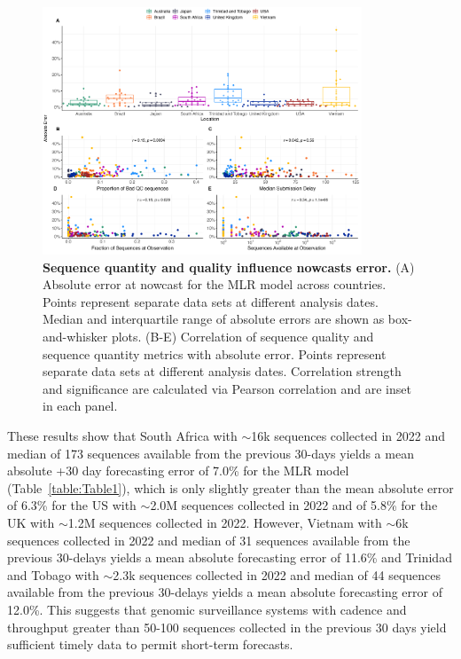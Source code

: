 \begin{figure}[tb!]
	\centering
    \includegraphics[width=0.85\textwidth]{figures/Var_of_interest.png}
	\caption{
		\textbf{Sequence quantity and quality influence nowcasts error.}
    (A) Absolute error at nowcast for the MLR model across countries.
		Points represent separate data sets at different analysis dates.
		Median and interquartile range of absolute errors are shown as box-and-whisker plots.
		(B-E) Correlation of sequence quality and sequence quantity metrics with absolute error.
		Points represent separate data sets at different analysis dates.
    Correlation strength and significance are calculated via Pearson correlation and are inset in each panel.
	}
	\label{fig:Fig5}
\end{figure}

These results show that South Africa with $\sim$16k sequences collected in 2022 and median of 173 sequences available from the previous 30-days yields a mean absolute +30 day forecasting error of 7.0\% for the MLR model (Table~\ref{table:Table1}), which is only slightly greater than the mean absolute error of 6.3\% for the US with $\sim$2.0M sequences collected in 2022 and of 5.8\% for the UK with $\sim$1.2M sequences collected in 2022.
However, Vietnam with $\sim$6k sequences collected in 2022 and median of 31 sequences available from the previous 30-delays yields a mean absolute forecasting error of 11.6\% and Trinidad and Tobago with $\sim$2.3k sequences collected in 2022 and median of 44 sequences available from the previous 30-delays yields a mean absolute forecasting error of 12.0\%.
This suggests that genomic surveillance systems with cadence and throughput greater than 50-100 sequences collected in the previous 30 days yield sufficient timely data to permit short-term forecasts.


